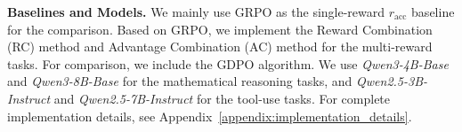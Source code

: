 \documentclass{llmxive}
\begin{document}

\textbf{Baselines and Models.} We mainly use GRPO \citep{grpo} as the single-reward $r_\text{acc}$ baseline for the comparison. Based on GRPO, we implement the Reward Combination (RC) method and Advantage Combination (AC) method for the multi-reward tasks. For comparison, we include the GDPO \citep{gdpo} algorithm. We use \textit{Qwen3-4B-Base} and \textit{Qwen3-8B-Base} \citep{qwen3} for the mathematical reasoning tasks, and \textit{Qwen2.5-3B-Instruct} and \textit{Qwen2.5-7B-Instruct} \citep{qwen2.5} for the tool-use tasks. For complete implementation details, see Appendix~\ref{appendix:implementation_details}.
\end{document}

